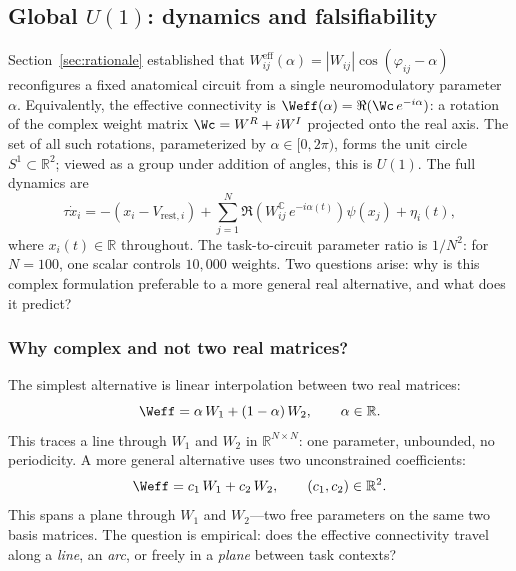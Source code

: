 \documentclass[11pt]{article}
\begin{document}
\subsection{Global $U(1)$: dynamics and falsifiability}
\label{sec:u1}

Section~\ref{sec:rationale} established that 
$W_{ij}^{\text{eff}}(\alpha) = |W_{ij}|\cos(\varphi_{ij} - \alpha)$ 
reconfigures a fixed anatomical circuit from a single neuromodulatory 
parameter $\alpha$. Equivalently, the effective connectivity is 
$\Weff(\alpha) = \Re(\Wc\, e^{-i\alpha})$: a rotation of the 
complex weight matrix $\Wc = W^R + iW^I$ projected onto the real 
axis. The set of all such rotations, parameterized by $\alpha 
\in [0, 2\pi)$, forms the unit circle $S^1 \subset \mathbb{R}^2$; viewed 
as a group under addition of angles, this is $U(1)$. The full 
dynamics are
\begin{equation}
\tau\dot{x}_i = -(x_i - V_{\text{rest},i}) + \sum_{j=1}^{N} 
\Re\!\left(W_{ij}^{\mathbb{C}}\, e^{-i\alpha(t)}\right)\psi(x_j) 
+ \eta_i(t),
\label{eq:u1_dynamics}
\end{equation}
where $x_i(t) \in \mathbb{R}$ throughout. The task-to-circuit parameter 
ratio is $1/N^2$: for $N = 100$, one scalar controls $10{,}000$ 
weights. Two questions arise: why is this complex formulation 
preferable to a more general real alternative, and what does it 
predict?

\subsubsection{Why complex and not two real matrices?}
\label{sec:why_complex}

The simplest alternative is linear interpolation between two real 
matrices:
\begin{equation}
\Weff = \alpha\, W_1 + (1-\alpha)\, W_2, \qquad \alpha \in \mathbb{R}.
\label{eq:linear}
\end{equation}
This traces a line through $W_1$ and $W_2$ in $\mathbb{R}^{N\times N}$: 
one parameter, unbounded, no periodicity. A more general alternative 
uses two unconstrained coefficients:
\begin{equation}
\Weff = c_1\, W_1 + c_2\, W_2, \qquad (c_1, c_2) \in \mathbb{R}^2.
\label{eq:real_alternative}
\end{equation}
This spans a plane through $W_1$ and $W_2$---two free parameters 
on the same two basis matrices. The question is empirical: does the 
effective connectivity travel along a \emph{line}, an \emph{arc}, 
or freely in a \emph{plane} between task contexts?
\end{document}
